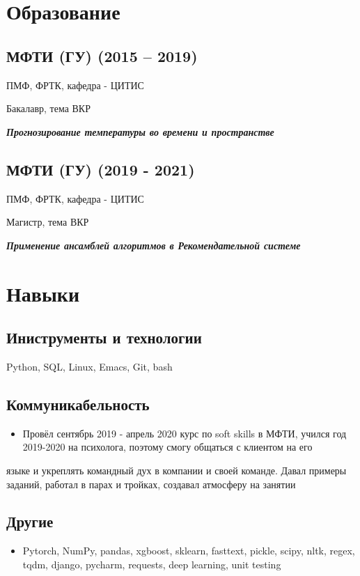 \documentclass[11pt]{article}
\begin{document}
\section{Образование}
\label{sec:org20a3a3a}
\subsection{МФТИ (ГУ) (2015 – 2019)}
\label{sec:orgb755b9a}
ПМФ, ФРТК, кафедра - ЦИТИС

Бакалавр, тема ВКР

\begin{center}
\textbf{\emph{Прогнозирование температуры во времени и пространстве}}
\end{center}
\subsection{МФТИ (ГУ) (2019 - 2021)}
\label{sec:orgb450a0a}
ПМФ, ФРТК, кафедра - ЦИТИС

Магистр, тема ВКР
\begin{center}
\textbf{\emph{Применение ансамблей алгоритмов в Рекомендательной системе}}
\end{center}

\section{Навыки}
\label{sec:org40618ce}
\subsection{Иниструменты и технологии}
\label{sec:org28a8546}
Python, SQL, Linux, Emacs, Git, bash
\subsection{Коммуникабельность}
\label{sec:org8041fdd}
\begin{itemize}
\item Провёл сентябрь 2019 - апрель 2020 курс по soft skills в МФТИ, учился год 2019-2020 на психолога, поэтому смогу общаться с клиентом на его
\end{itemize}
языке и укреплять командный дух в компании и своей команде. Давал примеры заданий, работал в парах и тройках, создавал атмосферу на занятии
\subsection{Другие}
\label{sec:orgd60742d}
\begin{itemize}
\item Pytorch, NumPy, pandas, xgboost, sklearn, fasttext, pickle, scipy, nltk, regex, tqdm, django, pycharm, requests, deep learning, unit testing
\end{itemize}
\end{document}
